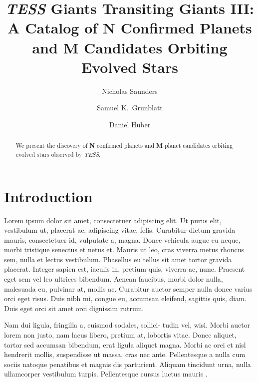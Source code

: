 \documentclass[twocolumn]{aastex631}
\begin{document}
\title{\textit{TESS} Giants Transiting Giants III: A Catalog of \textbf{N} Confirmed Planets and \textbf{M} Candidates Orbiting Evolved Stars}

\author[0000-0003-2657-3889]{Nicholas Saunders}

\author[0000-0003-4976-9980]{Samuel K.\ Grunblatt}

\author[0000-0001-8832-4488]{Daniel Huber}

\begin{abstract}
    We present the discovery of \textbf{N} confirmed planets and \textbf{M} planet candidates orbiting evolved stars observed by \textit{TESS}. 
\end{abstract}

\section{Introduction}
\label{sec:intro}

Lorem ipsum dolor sit amet, consectetuer adipiscing elit.
Ut purus elit, vestibulum ut, placerat ac, adipiscing vitae, felis.
Curabitur dictum gravida mauris, consectetuer id, vulputate a, magna.
Donec vehicula augue eu neque, morbi tristique senectus et netus et.
Mauris ut leo, cras viverra metus rhoncus sem, nulla et lectus vestibulum.
Phasellus eu tellus sit amet tortor gravida placerat.
Integer sapien est, iaculis in, pretium quis, viverra ac, nunc.
Praesent eget sem vel leo ultrices bibendum.
Aenean faucibus, morbi dolor nulla, malesuada eu, pulvinar at, mollis ac.
Curabitur auctor semper nulla donec varius orci eget risus.
Duis nibh mi, congue eu, accumsan eleifend, sagittis quis, diam.
Duis eget orci sit amet orci dignissim rutrum.

Nam dui ligula, fringilla a, euismod sodales, sollici- tudin vel, wisi.
Morbi auctor lorem non justo, nam lacus libero, pretium at, lobortis vitae.
Donec aliquet, tortor sed accumsan bibendum, erat ligula aliquet magna.
Morbi ac orci et nisl hendrerit mollis, suspendisse ut massa, cras nec ante.
Pellentesque a nulla cum sociis natoque penatibus et magnis dis parturient.
Aliquam tincidunt urna, nulla ullamcorper vestibulum turpis.
Pellentesque cursus luctus mauris \citep{Luger2021}.


\end{document}
